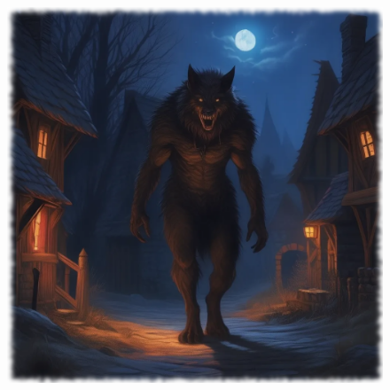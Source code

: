 

\begin{figure}[h]
\begin{center}
\includegraphics[scale=0.24]{img/ai-images/werewolf.png}
\end{center}
\end{figure}
